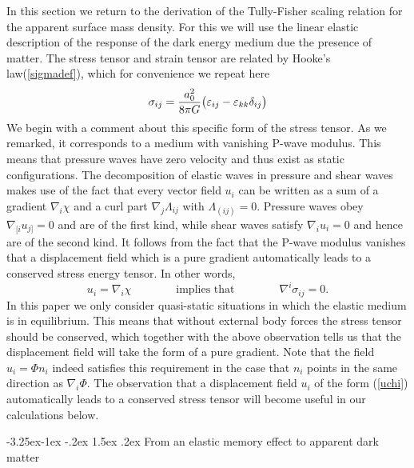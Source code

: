 \documentclass[a4paper,12pt]{article}
\makeatletter
\renewcommand\subsection{\@startsection{subsection}{2}{\z@}%
                                     {-3.25ex\@plus -1ex \@minus -.2ex}%
                                     {1.5ex \@plus .2ex}%
                                     {\normalfont\bfseries}}
\newcommand{\be}{\begin{equation}}
\newcommand{\ee}{\end{equation}}
\makeatother
\begin{document}
In this section we return to the derivation of the Tully-Fisher scaling relation for the apparent surface mass density. For this we will use the linear elastic description of the response of the dark energy medium due the presence of matter. The stress tensor and strain tensor are related by Hooke's law(\ref{sigmadef}), which for convenience we repeat here
\be
\label{sigmadef2}
\sigma_{ij}  = {a_0^2\over 8\pi G}\bigl(\varepsilon_{ij}- \varepsilon_{kk}\delta_{ij}\bigr)
\ee
We begin with a comment about this specific form of the stress tensor. As we remarked, it corresponds to a medium with vanishing P-wave modulus. This means that pressure waves have zero velocity and thus exist as static configurations.  The decomposition of elastic waves in pressure and shear waves makes use of the fact that every vector field $u_i$ can be written as a sum of a gradient $\nabla_i\chi$ and a curl part $\nabla_j \Lambda_{ij}$ with $\Lambda_{(ij)}=0$.  Pressure waves obey $\nabla_{[i} u_{j]}=0$ and are of the first kind, while shear waves satisfy $\nabla_i u_i=0$ and  hence are of the second kind.   It follows from the fact that the P-wave modulus vanishes that a displacement field which is a pure gradient automatically leads to a conserved stress energy tensor. In other words, 
\begin{equation}
\label{uchi}
u_i =\nabla_i\chi \qquad\qquad\mbox{implies that}\qquad \qquad \nabla^i\sigma_{ij} =0.
\end{equation}
In this paper we only consider quasi-static situations in which the elastic medium is in equilibrium.  This means that without external body forces the stress tensor should be conserved, which together with the above observation tells us that the displacement field will take the form of a pure gradient. Note that the field $u_i= \Phi n_i$ indeed satisfies this requirement in the case that $n_i$ points in the same direction as $\nabla_i\Phi$.   The observation that  a displacement field $u_i$ of the form (\ref{uchi}) automatically leads to a conserved stress tensor  will become useful in our calculations below. 

\subsection{From an elastic memory effect to apparent dark matter}


\end{document}
